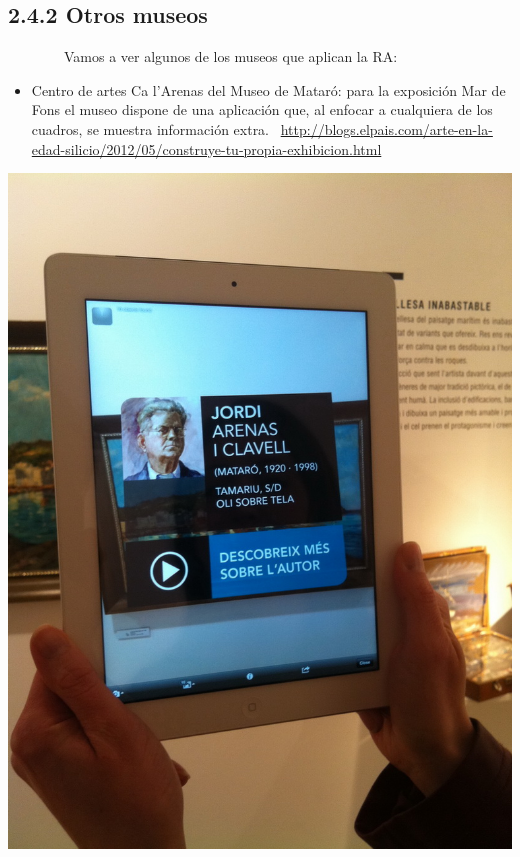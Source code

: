 \documentclass[]{article}
\begin{document}
\subsection{2.4.2 Otros museos}\label{h.alfq827rfehx}

~~~~~~~~Vamos a ver algunos de los museos que aplican la RA:

\begin{itemize}
\itemsep1pt\parskip0pt
\item
  Centro de artes Ca l'Arenas del Museo de Mataró: para la exposición
  Mar de Fons el museo dispone de una aplicación que, al enfocar a
  cualquiera de los cuadros, se muestra información extra.
  ~\href{https://www.google.com/url?q=http://blogs.elpais.com/arte-en-la-edad-silicio/2012/05/construye-tu-propia-exhibicion.html\&sa=D\&ust=1464799690059000\&usg=AFQjCNEt_qw-SWuNUdtititu4dlhnNVyaw}{http://blogs.elpais.com/arte-en-la-edad-silicio/2012/05/construye-tu-propia-exhibicion.html}
\end{itemize}

\includegraphics{images/image02.jpg}
\end{document}
